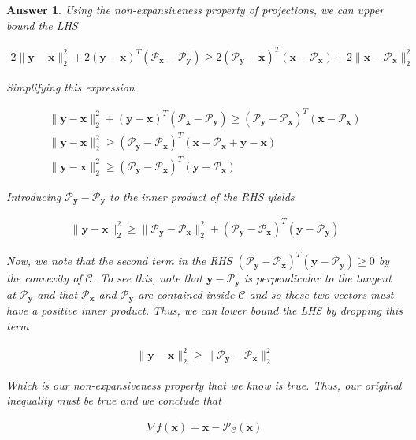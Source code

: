 \documentclass[12pt]{article}
\theoremstyle{colon}
\newtheorem*{answer}{Answer}
\begin{document}
\begin{answer}
  Using the non-expansiveness property of projections, we can upper bound the LHS

  \begin{gather*}
    2 \lVert \bm{y} - \bm{x} \rVert_2^2 +2(\bm{y} - \bm{x})^T (\mathcal{P}_{\bm{x}} - \mathcal{P}_{\bm{y}}) \geq 2(\mathcal{P}_{\bm{y}} - \bm{x})^T (\bm{x} - \mathcal{P}_{\bm{x}}) + 2 \lVert \bm{x} - \mathcal{P}_{\bm{x}} \rVert_2^2
  \end{gather*}

  Simplifying this expression

  \begin{gather*}
    \lVert \bm{y} - \bm{x} \rVert_2^2 +(\bm{y} - \bm{x})^T (\mathcal{P}_{\bm{x}} - \mathcal{P}_{\bm{y}}) \geq (\mathcal{P}_{\bm{y}} - \mathcal{P}_{\bm{x}})^T (\bm{x} - \mathcal{P}_{\bm{x}}) \\
    \lVert \bm{y} - \bm{x} \rVert_2^2 \geq (\mathcal{P}_{\bm{y}} - \mathcal{P}_{\bm{x}})^T (\bm{x} - \mathcal{P}_{\bm{x}} + \bm{y} - \bm{x}) \\
    \lVert \bm{y} - \bm{x} \rVert_2^2 \geq (\mathcal{P}_{\bm{y}} - \mathcal{P}_{\bm{x}})^T (\bm{y} - \mathcal{P}_{\bm{x}})
  \end{gather*}

  Introducing $\mathcal{P}_{\bm{y}} - \mathcal{P}_{\bm{y}}$ to the inner product of the RHS yields

  \begin{gather*}
    \lVert \bm{y} - \bm{x} \rVert_2^2 \geq \lVert \mathcal{P}_{\bm{y}} - \mathcal{P}_{\bm{x}} \rVert_2^2 + (\mathcal{P}_{\bm{y}} - \mathcal{P}_{\bm{x}})^T (\bm{y} - \mathcal{P}_{\bm{y}})
  \end{gather*}

  Now, we note that the second term in the RHS $(\mathcal{P}_{\bm{y}} - \mathcal{P}_{\bm{x}})^T (\bm{y} - \mathcal{P}_{\bm{y}}) \geq 0$ by the convexity of $\mathcal{C}$. To see this, note that $\bm{y} - \mathcal{P}_{\bm{y}}$ is perpendicular to the tangent at $\mathcal{P}_{\bm{y}}$ and that $\mathcal{P}_{\bm{x}}$ and $\mathcal{P}_{\bm{y}}$ are contained inside $\mathcal{C}$ and so these two vectors must have a positive inner product. Thus, we can lower bound the LHS by dropping this term

  \begin{gather*}
    \lVert \bm{y} - \bm{x} \rVert_2^2 \geq \lVert \mathcal{P}_{\bm{y}} - \mathcal{P}_{\bm{x}} \rVert_2^2
  \end{gather*}

  Which is our non-expansiveness property that we know is true. Thus, our original inequality must be true and we conclude that

  \begin{gather*}
    \nabla f(\bm{x}) = \bm{x} - \mathcal{P}_\mathcal{C} (\bm{x})
  \end{gather*}

\end{answer}
\end{document}
